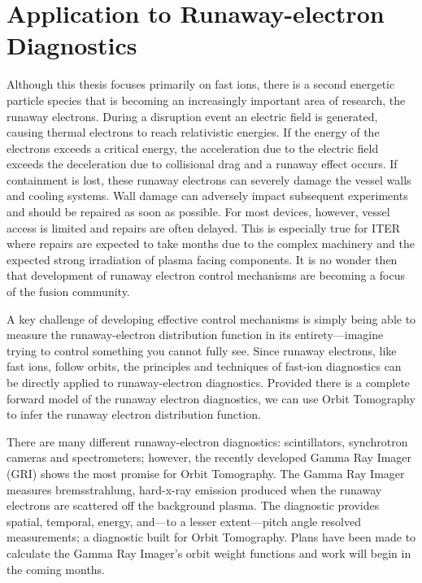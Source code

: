 \section{Application to Runaway-electron Diagnostics}
Although this thesis focuses primarily on fast ions, there is a second energetic particle species that is becoming an increasingly important area of research, the runaway electrons.
During a disruption event an electric field is generated, causing thermal electrons to reach relativistic energies.
If the energy of the electrons exceeds a critical energy, the acceleration due to the electric field exceeds the deceleration due to collisional drag and a runaway effect occurs.
If containment is lost, these runaway electrons can severely damage the vessel walls and cooling systems.
Wall damage can adversely impact subsequent experiments and should be repaired as soon as possible.
For most devices, however, vessel access is limited and repairs are often delayed.
This is especially true for ITER where repairs are expected to take months due to the complex machinery and the expected strong irradiation of plasma facing components.\cite{iter1999overview,ikeda2007progress,hender2007mhd,boozer2017runaway}
It is no wonder then that development of runaway electron control mechanisms are becoming a focus of the fusion community.
 
A key challenge of developing effective control mechanisms is simply being able to measure the runaway-electron distribution function in its entirety---imagine trying to control something you cannot fully see.
Since runaway electrons, like fast ions, follow orbits, the principles and techniques of fast-ion diagnostics can be directly applied to runaway-electron diagnostics. Provided there is a complete forward model of the runaway electron diagnostics, we can use Orbit Tomography to infer the runaway electron distribution function. 

There are many different runaway-electron diagnostics: scintillators, synchrotron cameras and spectrometers; however, the recently developed Gamma Ray Imager\cite{paz2017spatiotemporal} (GRI) shows the most promise for Orbit Tomography. The Gamma Ray Imager measures bremsstrahlung, hard-x-ray emission produced when the runaway electrons are scattered off the background plasma.
The diagnostic provides spatial, temporal, energy, and---to a lesser extent---pitch angle resolved measurements; a diagnostic built for Orbit Tomography. Plans have been made to calculate the Gamma Ray Imager's orbit weight functions and work will begin in the coming months.
